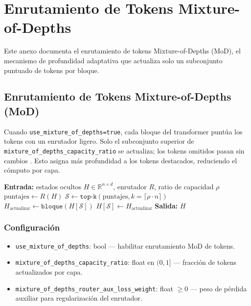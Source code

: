 \section{Enrutamiento de Tokens Mixture-of-Depths}
\label{sec:annex-mod}

Este anexo documenta el enrutamiento de tokens Mixture-of-Depths (MoD), el mecanismo de profundidad adaptativa que actualiza solo un subconjunto puntuado de tokens por bloque.

\subsection{Enrutamiento de Tokens Mixture-of-Depths (MoD)}


Cuando \texttt{use\_mixture\_of\_depths=true}, cada bloque del transformer puntúa los tokens con un enrutador ligero. Solo el subconjunto superior de \texttt{mixture\_of\_depths\_capacity\_ratio} se actualiza; los tokens omitidos pasan sin cambios \citep{zhu2026mixtureofdepthsattention}. Esto asigna más profundidad a los tokens destacados, reduciendo el cómputo por capa.

\begin{algorithmic}[1]
\State \textbf{Entrada:} estados ocultos $H \in \mathbb{R}^{n \times d}$, enrutador $R$, ratio de capacidad $\rho$
\State $\text{puntajes} \gets R(H)$ 
\State $\mathcal{S} \gets \texttt{top-k}(\text{puntajes}, k=\lceil \rho \cdot n \rceil)$ 
\State $H_{\text{actualizar}} \gets \texttt{bloque}(H[\mathcal{S}])$ 
\State $H[\mathcal{S}] \gets H_{\text{actualizar}}$ 
\State \textbf{Salida:} $H$ 
\end{algorithmic}

\subsubsection{Configuración}
\begin{itemize}[leftmargin=*]
    \item \texttt{use\_mixture\_of\_depths}: bool --- habilitar enrutamiento MoD de tokens.
    \item \texttt{mixture\_of\_depths\_capacity\_ratio}: float en $(0, 1]$ --- fracción de tokens actualizados por capa.
    \item \texttt{mixture\_of\_depths\_router\_aux\_loss\_weight}: float $\ge 0$ --- peso de pérdida auxiliar para regularización del enrutador.
\end{itemize}

